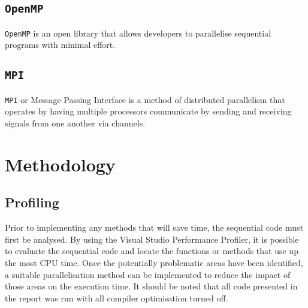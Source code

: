 \documentclass[journal,transmag]{IEEEtran}
\begin{document}
	\subsection{\texttt{OpenMP}}
		\texttt{OpenMP} is an open library that allows developers to parallelise sequential programs with minimal effort. 
	
	\subsection{\texttt{MPI}}
		\texttt{MPI} or Message Passing Interface is a method of distributed parallelism that operates by having multiple processors communicate by sending and receiving signals from one another via channels. 
		
\section{Methodology}
	
	
	\subsection{Profiling}
		Prior to implementing any methods that will save time, the sequential code must first be analysed. By using the Visual Studio Performance Profiler, it is possible to evaluate the sequential code and locate the functions or methods that use up the most CPU time. Once the potentially problematic areas have been identified, a suitable parallelisation method can be implemented to reduce the impact of those areas on the execution time. It should be noted that all code presented in the report was run with all compiler optimisation turned off. 	
		
\end{document}
